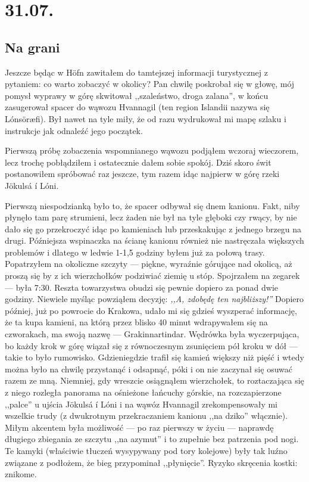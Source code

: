 \chapter*{31.07.}

\section*{Na grani}

Jeszcze będąc w Höfn zawitałem do tamtejszej informacji turystycznej z pytaniem: co warto zobaczyć w okolicy? Pan chwilę poskrobał się w głowę, mój pomysł wyprawy w górę  skwitował ,,szaleństwo, droga zalana'', w końcu zasugerował spacer do wąwozu Hvannagil (ten region Islandii nazywa się Lónsöræfi). Był nawet na tyle miły, że od razu wydrukował mi mapę szlaku i instrukcje jak odnaleźć jego początek.

Pierwszą próbę zobaczenia wspomnianego wąwozu podjąłem wczoraj wieczorem, lecz trochę pobłądziłem i ostatecznie dałem sobie spokój. Dziś skoro świt postanowiłem spróbować raz jeszcze, tym razem idąc najpierw w górę rzeki Jökulsá í Lóni.

Pierwszą niespodzianką było to, że spacer odbywał się dnem kanionu. Fakt, niby płynęło tam parę strumieni, lecz żaden nie był na tyle głęboki czy rwący, by nie dało się go przekroczyć idąc po kamieniach lub przeskakując z jednego brzegu na drugi. Późniejsza wspinaczka na ścianę kanionu również nie nastręczała większych problemów i dlatego w ledwie 1-1,5 godziny byłem już za połową trasy. Popatrzyłem na okoliczne szczyty --- piękne, wyraźnie górujące nad okolicą, aż proszą się by z ich wierzchołków podziwiać ziemię u stóp. Spojrzałem na zegarek --- była 7:30. Reszta towarzystwa obudzi się pewnie dopiero za ponad dwie godziny. Niewiele myśląc powziąłem decyzję: \emph{,,A, zdobędę ten najbliższy!''} Dopiero później, już po powrocie do Krakowa, udało mi się gdzieś wyszperać informację, że ta kupa kamieni, na którą przez blisko 40 minut wdrapywałem się na czworakach, ma swoją nazwę --- Grakinnartindar. Wędrówka była wyczerpująca, bo każdy krok w górę wiązał się z równoczesnym zsunięciem pół kroku w dół --- takie to było rumowisko. Gdzieniegdzie trafił się kamień większy niż pięść i wtedy można było na chwilę przystanąć i odsapnąć, póki i on nie zaczynał się osuwać razem ze mną. Niemniej, gdy wreszcie osiągnąłem wierzchołek, to roztaczająca się z niego rozległa panorama na ośnieżone łańcuchy górskie, na rozczapierzone ,,palce'' u ujścia Jökulsá í Lóni i na wąwóz Hvannagil zrekompensowały mi wszelkie trudy (z dwukrotnym przekraczaniem kanionu ,,na dziko'' włącznie). Miłym akcentem była możliwość --- po raz pierwszy w życiu --- naprawdę długiego zbiegania ze szczytu ,,na azymut'' i to zupełnie bez patrzenia pod nogi. Te kamyki (właściwie tłuczeń wysypywany pod tory kolejowe) były tak luźno związane z podłożem, że bieg przypominał ,,płynięcie''. Ryzyko skręcenia kostki: znikome.

